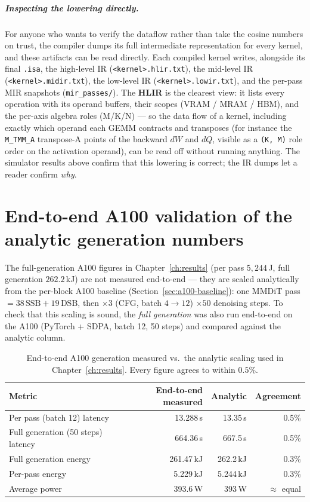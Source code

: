 \documentclass[11pt]{report}
\begin{document}
\paragraph{Inspecting the lowering directly.} For anyone who wants to verify
the dataflow rather than take the cosine numbers on trust, the compiler dumps
its full intermediate representation for every kernel, and these artifacts can
be read directly. Each compiled kernel writes, alongside its final
\texttt{.isa}, the high-level IR (\texttt{<kernel>.hlir.txt}), the mid-level IR
(\texttt{<kernel>.midir.txt}), the low-level IR (\texttt{<kernel>.lowir.txt}),
and the per-pass MIR snapshots (\texttt{mir\_passes/}). The \textbf{HLIR} is
the clearest view: it lists every operation with its operand buffers, their
scopes (VRAM / MRAM / HBM), and the per-axis algebra roles (M/K/N) --- so the
data flow of a kernel, including exactly which operand each GEMM contracts and
transposes (for instance the \texttt{M\_TMM\_A} transpose-A points of the
backward $dW$ and $dQ$, visible as a \texttt{(K, M)} role order on the
activation operand), can be read off without running anything. The simulator
results above confirm that this lowering is correct; the IR dumps let a reader
confirm \emph{why}.

\chapter{End-to-end A100 validation of the analytic generation numbers}
\label{app:a100-validation}

The full-generation A100 figures in Chapter~\ref{ch:results} (per pass
$5{,}244$\,J, full generation $262.2$\,kJ) are not measured end-to-end ---
they are scaled analytically from the per-block A100 baseline
(Section~\ref{sec:a100-baseline}): one MMDiT pass $= 38\,\text{SSB} +
19\,\text{DSB}$, then $\times3$ (CFG, batch $4\to12$) $\times50$ denoising
steps. To check that this scaling is sound, the \emph{full generation} was
also run end-to-end on the A100 (PyTorch + SDPA, batch 12, 50 steps) and
compared against the analytic column.

\begin{table}[h]
\centering
\caption{End-to-end A100 generation measured vs.\ the analytic scaling used
in Chapter~\ref{ch:results}. Every figure agrees to within $0.5\%$.}
\label{tab:a100-e2e}
\begin{tabular}{@{}lrrr@{}}
\toprule
Metric & End-to-end measured & Analytic & Agreement \\
\midrule
Per pass (batch 12) latency & 13.288\,s & 13.35\,s & 0.5\% \\
Full generation (50 steps) latency & 664.36\,s & 667.5\,s & 0.5\% \\
Full generation energy & 261.47\,kJ & 262.2\,kJ & 0.3\% \\
Per-pass energy & 5.229\,kJ & 5.244\,kJ & 0.3\% \\
Average power & 393.6\,W & 393\,W & $\approx$ equal \\
\bottomrule
\end{tabular}
\end{table}
\end{document}
